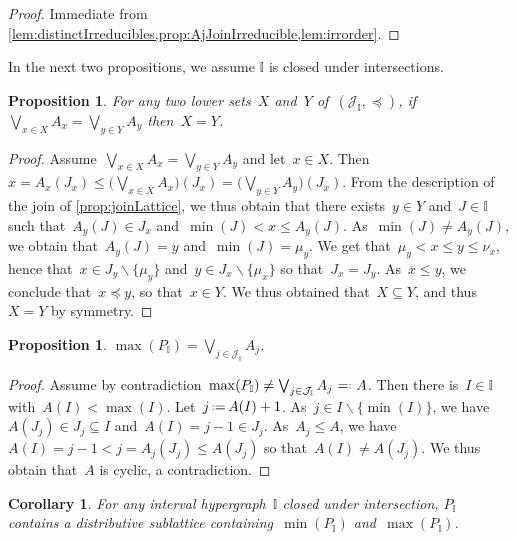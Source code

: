 \documentclass{amsart}
\newtheorem{corollary}[theorem]{Corollary}
\newtheorem{proposition}[theorem]{Proposition}
\theoremstyle{definition}
\newcommand{\cal}[1]{\mathcal{#1}} %
\newcommand{\ssm}{\smallsetminus} %
\newcommand{\eqdef}{\mbox{\,\raisebox{0.2ex}{\scriptsize\ensuremath{\mathrm:}}\ensuremath{=}\,}} %
\newcommand{\defeq}{\mbox{~\ensuremath{=}\raisebox{0.2ex}{\scriptsize\ensuremath{\mathrm:}} }} %
\newcommand{\bigJoin}{\bigvee} %
\newcommand{\II}{\mathbb I} %
\newcommand{\cJ}{\cal{J}} %
\begin{document}
\begin{proof}
Immediate from \cref{lem:distinctIrreducibles,prop:AjJoinIrreducible,lem:irrorder}.
\end{proof}

In the next two propositions, we assume $\II$ is closed under intersections.

\begin{proposition}
\label{prop:injectivityDistributive}
For any two lower sets~$X$ and~$Y$ of~$(\cJ_\II, \preccurlyeq)$, if~$\bigJoin\limits_{x \in X} A_x = \bigJoin\limits_{y \in Y} A_y$ then~$X = Y$.
\end{proposition}

\begin{proof}
Assume~$\bigJoin\limits_{x \in X} A_x = \bigJoin\limits_{y \in Y} A_y$ and let~$x \in X$.
Then $x = A_x(J_x) \le \big( \bigJoin\limits_{x \in X} A_x \big)(J_x) = \big( \bigJoin\limits_{y \in Y} A_y \big)(J_x)$.
From the description of the join of \cref{prop:joinLattice}, we thus obtain that there exists~$y \in Y$ and~$J \in \II$ such that~$A_y(J) \in J_x$ and~$\min(J) < x \le A_y(J)$.
As~$\min(J) \ne A_y(J)$, we obtain that~$A_y(J) = y$ and~$\min(J) = \mu_y$.
We get that~$\mu_y < x \le y \le \nu_x$, hence that~$x \in J_y \ssm \{\mu_y\}$ and~$y \in J_x \ssm \{\mu_x\}$ so that~$J_x = J_y$.
As~$x \le y$, we conclude that~$x \preccurlyeq y$, so that~$x \in Y$.
We thus obtained that~$X \subseteq Y$, and thus~$X = Y$ by symmetry.
\end{proof}

\begin{proposition}
$\displaystyle \max(P_\II) = \bigJoin\limits_{j \in \cJ_\II} A_j$.
\end{proposition}

\begin{proof}
Assume by contradiction~$\max(P_\II) \ne \bigJoin_{j \in \cJ_\II} A_j \defeq A$.
Then there is~$I \in \II$ with~${A(I) < \max(I)}$.
Let~$j \eqdef A(I) + 1$.
As~$j \in I \ssm \{\min(I)\}$, we have~$A(J_j) \in J_j \subseteq I$ and~$A(I) = j-1 \in J_j$.
As~$A_j \le A$, we have~$A(I) = j-1 < j = A_j(J_j) \le A(J_j)$ so that~$A(I) \ne A(J_j)$.
We thus obtain that~$A$ is cyclic, a contradiction.
\end{proof}

\begin{corollary}
For any interval hypergraph~$\II$ closed under intersection, $P_\II$ contains a distributive sublattice containing~$\min(P_\II)$ and~$\max(P_\II)$.
\end{corollary}
\end{document}
